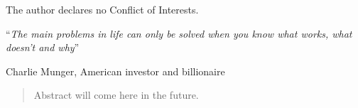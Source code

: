 \documentclass[
12pt, %
english, %
doublespacing, %
headsepline, %
]{MastersDoctoralThesis} %
\begin{document}
\begin{confli}
\addchaptertocentry{\confliname}
The author declares no Conflict of Interests.
\end{confli}

\cleardoublepage


\vspace*{0.2\textheight}

\noindent\enquote{\itshape The main problems in life can only be solved when you know what works, what doesn't and why}\bigbreak

\hfill Charlie Munger, American investor and billionaire


\begin{abstract}
\addchaptertocentry{\abstractname} %
Abstract will come here in the future.
\end{abstract}

\end{document}
